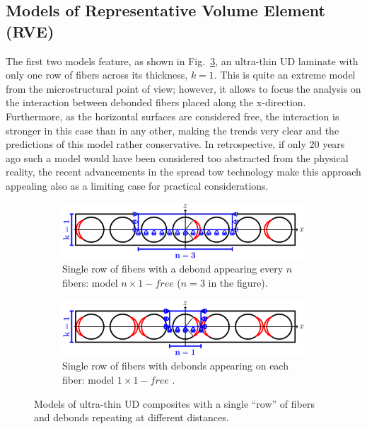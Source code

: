 \subsection{Models of Representative Volume Element (RVE)}\label{paperB:subsec:rve}

The first two models feature, as shown in Fig.~\ref{paperB:fig:laminateModelsA}, an ultra-thin UD laminate with only one row of fibers across its thickness, $k=1$. This is quite an extreme model from the microstructural point of view; however, it allows to focus the analysis on the interaction between debonded fibers placed along the x-direction. Furthermore, as the horizontal surfaces are considered free, the interaction is stronger in this case than in any other, making the trends very clear and the predictions of this model rather conservative. In retrospective, if only 20 years ago such a model would have been considered too abstracted from the physical reality, the recent advancements in the spread tow technology make this approach appealing also as a limiting case for practical considerations.

\begin{figure}[!h]
\centering
    \begin{subfigure}[b]{0.9\textwidth}
        \includegraphics[width=\textwidth]{paperB/freeThinPly.pdf}
        \caption{Single row of fibers with a debond appearing every $n$ fibers: model $n\times1-free$ ($n=3$ in the figure).}\label{paperB:subfig:freethinply}
    \end{subfigure}

    \begin{subfigure}[b]{0.9\textwidth}
        \includegraphics[width=\textwidth]{paperB/freeThinPlyAllDebonds.pdf}
        \caption{Single row of fibers with debonds appearing on each fiber: model $1\times1-free$ .}\label{paperB:subfig:freethinplyalldebonds}
    \end{subfigure}

\caption{Models of ultra-thin UD composites with a single ``row'' of fibers and debonds repeating at different distances.}\label{paperB:fig:laminateModelsA}
\end{figure}

